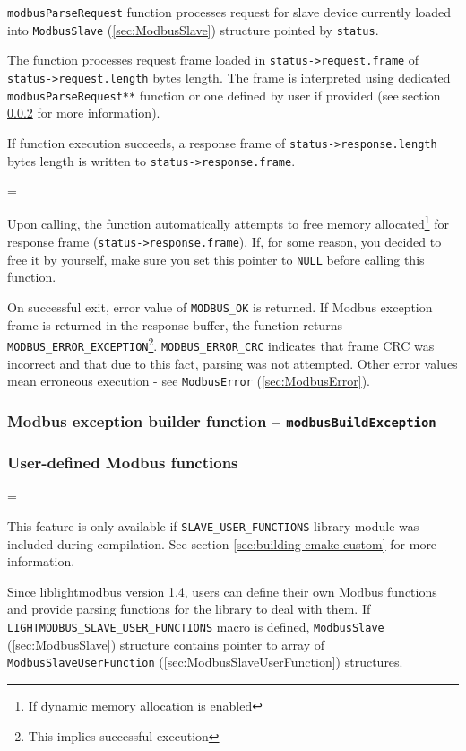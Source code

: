 \documentclass[11pt,a4paper]{article}
\newenvironment{warning}
{
	\par\begin{mdframed}[linewidth=0.5pt,linecolor=black]%
	\begin{list}{}{\leftmargin=1cm
	\labelwidth=\leftmargin}\item[\Large\ding{43}]
}
{	
	\end{list}\end{mdframed}\par
}
\newcommand{\coderef}[1]{\texttt{{#1}} (\ref{sec:#1})}
\newcommand{\warnbox}[1]{\vspace{0.2cm}\begin{warning}{#1}\end{warning}\vspace{0.2cm}}
\begin{document}
\texttt{modbusParseRequest} function processes request for slave device currently loaded into \coderef{ModbusSlave} structure pointed by \texttt{status}.\newline

The function processes request frame loaded in \texttt{status->request.frame} of \texttt{status->request.length} bytes length. The frame is interpreted using dedicated \texttt{modbusParseRequest**} function or one defined by user if provided (see section \ref{sec:slave-user-functions} for more information).\newline

If function execution succeeds, a response frame of \texttt{status->response.length} bytes length is written to \texttt{status->response.frame}.

\warnbox{Upon calling, the function automatically attempts to free memory allocated\footnote{If dynamic memory allocation is enabled} for response frame (\texttt{status->response.frame}). If, for some reason, you decided to free it by yourself, make sure you set this pointer to \texttt{NULL} before calling this function.}

On successful exit, error value of \texttt{MODBUS\_OK} is returned. If Modbus exception frame is returned in the response buffer, the function returns \texttt{MODBUS\_ERROR\_EXCEPTION}\footnote{This implies successful execution}. \texttt{MODBUS\_ERROR\_CRC} indicates that frame CRC was incorrect and that due to this fact, parsing was not attempted. 
Other error values mean erroneous execution - see \coderef{ModbusError}.


\subsubsection{Modbus exception builder function -- \texttt{modbusBuildException}} \label{sec:modbusBuildException}
\subsubsection{User-defined Modbus functions} \label{sec:slave-user-functions}
\warnbox{This feature is only available if \texttt{SLAVE\_USER\_FUNCTIONS} library module was included during compilation. See section \ref{sec:building-cmake-custom} for more information. }

Since liblightmodbus version 1.4, users can define their own Modbus functions and provide parsing functions for the library to deal with them. If \texttt{LIGHTMODBUS\_SLAVE\_USER\_FUNCTIONS} macro is defined, \coderef{ModbusSlave} structure contains pointer to array of \coderef{ModbusSlaveUserFunction} structures. \newline 
\end{document}
